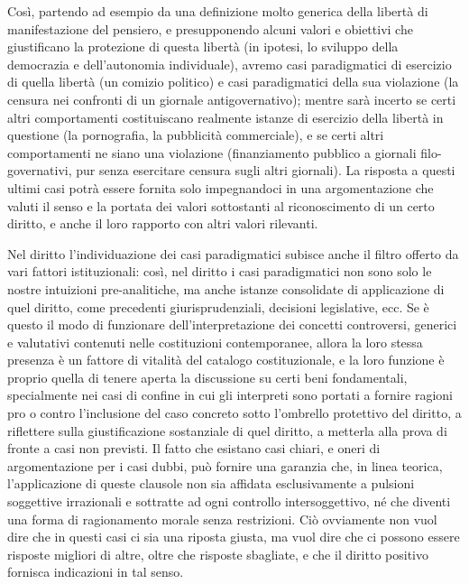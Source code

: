 Così, partendo ad esempio da una definizione molto generica della libertà di manifestazione del pensiero, e presupponendo alcuni valori e obiettivi che giustificano la protezione di questa libertà (in ipotesi, lo sviluppo della democrazia e dell’autonomia individuale), avremo casi paradigmatici di esercizio di quella libertà (un comizio politico) e casi paradigmatici della sua violazione (la censura nei confronti di un giornale antigovernativo); mentre sarà incerto se certi altri comportamenti costituiscano realmente istanze di esercizio della libertà in questione (la pornografia, la pubblicità commerciale), e se certi altri comportamenti ne siano una violazione (finanziamento pubblico a giornali filo-governativi, pur senza esercitare censura sugli altri giornali). La risposta a questi ultimi casi potrà essere fornita solo impegnandoci in una argomentazione che valuti il senso e la portata dei valori sottostanti al riconoscimento di un certo diritto, e anche il loro rapporto con altri valori rilevanti.

Nel diritto l’individuazione dei casi paradigmatici subisce anche il filtro offerto da vari fattori istituzionali: così, nel diritto i casi paradigmatici non sono solo le nostre intuizioni pre-analitiche, ma anche istanze consolidate di applicazione di quel diritto, come precedenti giurisprudenziali, decisioni legislative, ecc. Se è questo il modo di funzionare dell’interpretazione dei concetti controversi, generici e valutativi contenuti nelle costituzioni contemporanee, allora la loro stessa presenza è un fattore di vitalità del catalogo costituzionale, e la loro funzione è proprio quella di tenere aperta la discussione su certi beni fondamentali, specialmente nei casi di confine in cui gli interpreti sono portati a fornire ragioni pro o contro l’inclusione del caso concreto sotto l’ombrello protettivo del diritto, a riflettere sulla giustificazione sostanziale di quel diritto, a metterla alla prova di fronte a casi non previsti.
Il fatto che esistano casi chiari, e oneri di argomentazione per i casi dubbi, può fornire una garanzia che, in linea teorica, l’applicazione di queste clausole non sia affidata esclusivamente a pulsioni soggettive irrazionali e sottratte ad ogni controllo intersoggettivo, né che diventi una forma di ragionamento morale senza restrizioni. Ciò ovviamente non vuol dire che in questi casi ci sia una riposta giusta, ma vuol dire che ci possono essere risposte migliori di altre, oltre che risposte sbagliate, e che il diritto positivo fornisca
indicazioni in tal senso.


